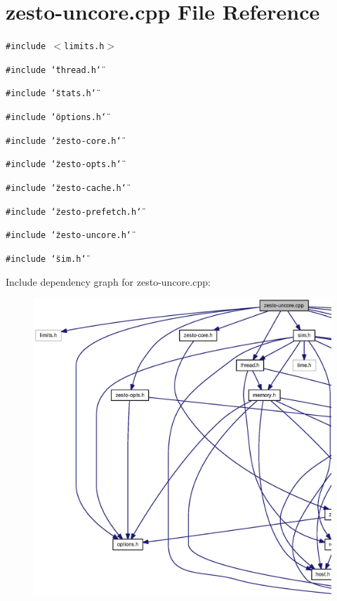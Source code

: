 \section{zesto-uncore.cpp File Reference}
\label{zesto-uncore_8cpp}
{\tt \#include $<$limits.h$>$}\par
{\tt \#include \char`\"{}thread.h\char`\"{}}\par
{\tt \#include \char`\"{}stats.h\char`\"{}}\par
{\tt \#include \char`\"{}options.h\char`\"{}}\par
{\tt \#include \char`\"{}zesto-core.h\char`\"{}}\par
{\tt \#include \char`\"{}zesto-opts.h\char`\"{}}\par
{\tt \#include \char`\"{}zesto-cache.h\char`\"{}}\par
{\tt \#include \char`\"{}zesto-prefetch.h\char`\"{}}\par
{\tt \#include \char`\"{}zesto-uncore.h\char`\"{}}\par
{\tt \#include \char`\"{}sim.h\char`\"{}}\par


Include dependency graph for zesto-uncore.cpp:\nopagebreak
\begin{figure}[H]
\begin{center}
\leavevmode
\includegraphics[width=420pt]{zesto-uncore_8cpp__incl}
\end{center}
\end{figure}

